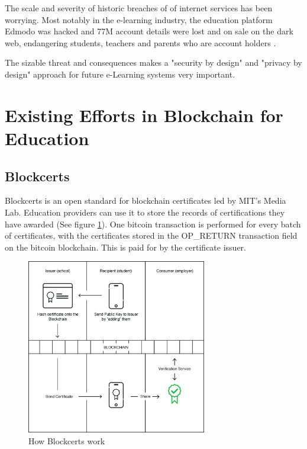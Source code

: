 The scale and severity of historic breaches of of internet services has been worrying. Most notably in the e-learning 
industry, the education platform Edmodo was hacked and 77M account details were lost and on sale on the dark 
web, endangering students, teachers and parents who are account holders \citep{opsecmonkey2017edmodo}.

The sizable threat and consequences makes a "security by design" and "privacy by design" approach for future e-Learning 
systems very important.

\section{Existing Efforts in Blockchain for Education}


\subsection{Blockcerts}

Blockcerts is an open standard for blockchain certificates led by MIT’s Media Lab. Education providers can use it to store 
the records of certifications they have awarded (See figure \ref{fig:blockcerts}). One bitcoin transaction is performed for 
every batch of certificates, with the certificates stored in the OP\_RETURN transaction field on the bitcoin blockchain. 
This is paid for by the certificate issuer. \citep{blockcerts2018}

\begin{figure}[!h] 
    \centering    
    \includegraphics[width=0.7\textwidth]{blockcerts}
    \caption[How Blockcerts work]
        {How Blockcerts work \citep{blockcerts2018}}
    \label{fig:blockcerts}
\end{figure}


